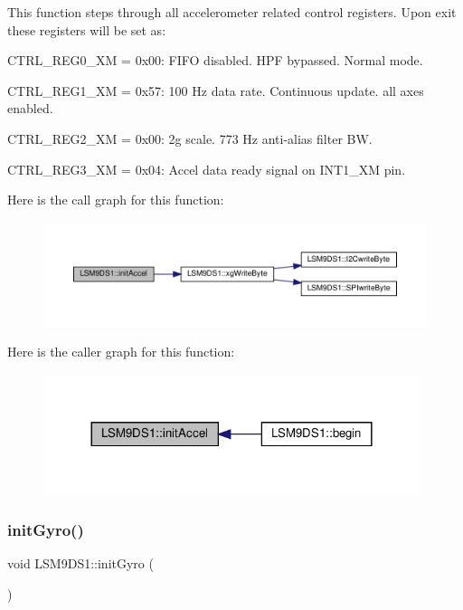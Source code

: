 This function steps through all accelerometer related control registers. Upon exit these registers will be set as\+:
\begin{DoxyItemize}
\item C\+T\+R\+L\+\_\+\+R\+E\+G0\+\_\+\+XM = 0x00\+: F\+I\+FO disabled. H\+PF bypassed. Normal mode.
\item C\+T\+R\+L\+\_\+\+R\+E\+G1\+\_\+\+XM = 0x57\+: 100 Hz data rate. Continuous update. all axes enabled.
\item C\+T\+R\+L\+\_\+\+R\+E\+G2\+\_\+\+XM = 0x00\+: 2g scale. 773 Hz anti-\/alias filter BW.
\item C\+T\+R\+L\+\_\+\+R\+E\+G3\+\_\+\+XM = 0x04\+: Accel data ready signal on I\+N\+T1\+\_\+\+XM pin. 
\end{DoxyItemize}Here is the call graph for this function\+:\nopagebreak
\begin{figure}[H]
\begin{center}
\leavevmode
\includegraphics[width=350pt]{classLSM9DS1_a143ff5abf4f7ba8e1c42325859106f84_cgraph}
\end{center}
\end{figure}
Here is the caller graph for this function\+:\nopagebreak
\begin{figure}[H]
\begin{center}
\leavevmode
\includegraphics[width=312pt]{classLSM9DS1_a143ff5abf4f7ba8e1c42325859106f84_icgraph}
\end{center}
\end{figure}
\mbox{\label{classLSM9DS1_a66a7b02acb28964ffc9362f25988e270}} 
\subsubsection{\texorpdfstring{init\+Gyro()}{initGyro()}}
{\footnotesize\ttfamily void L\+S\+M9\+D\+S1\+::init\+Gyro (\begin{DoxyParamCaption}{ }\end{DoxyParamCaption})\hspace{0.3cm}{\ttfamily [protected]}}



